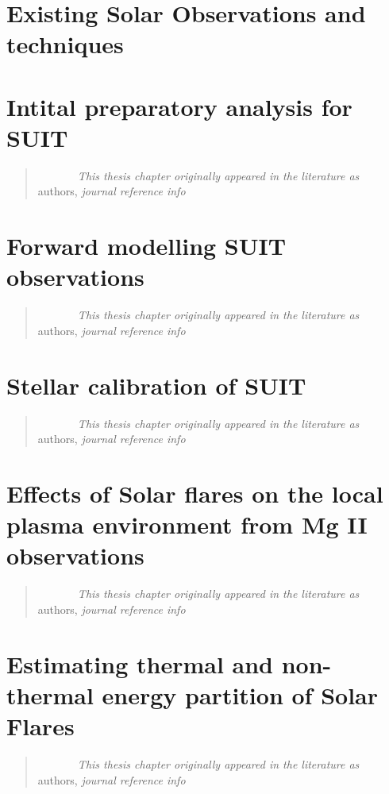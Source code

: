 \documentclass[plain]{hvdthesis}
\begin{document}
\chapter{Existing Solar Observations and techniques}\label{c:chap2}

\clearpage
%
\chapter{Intital preparatory analysis for SUIT}\label{c:chap3}
\begin{quote}
{\em ~~~~~~~This thesis chapter originally appeared in the literature as} \\
{authors,
{\em journal reference info}}
\end{quote}

\clearpage
%
\chapter{Forward modelling SUIT observations}\label{c:chap4}
\begin{quote}
{\em ~~~~~~~This thesis chapter originally appeared in the literature as} \\
{authors,
{\em journal reference info}}
\end{quote}

%
\chapter{Stellar calibration of SUIT}\label{c:chap5}
\begin{quote}
{\em ~~~~~~~This thesis chapter originally appeared in the literature as} \\
{authors,
{\em journal reference info}}
\end{quote}

%
\chapter{Effects of Solar flares on the local plasma environment from Mg II observations}\label{c:chap6}
\begin{quote}
{\em ~~~~~~~This thesis chapter originally appeared in the literature as} \\
{authors,
{\em journal reference info}}
\end{quote}

\clearpage
%
\chapter{Estimating thermal and non-thermal energy partition of Solar Flares}\label{c:chap7}
\begin{quote}
{\em ~~~~~~~This thesis chapter originally appeared in the literature as} \\
{authors,
{\em journal reference info}}
\end{quote}

\clearpage
%
\end{document}
